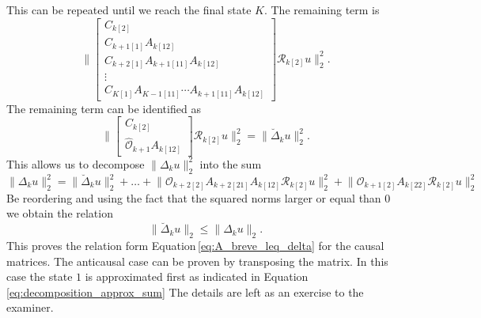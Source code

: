 \documentclass[doctype=mastersthesis,BCOR=15mm,biblatex]{ldvbook}%
\newcommand{\R}{\mathcal{R}} %
\newcommand{\Ob}{\mathcal{O}} %
\begin{document}
This can be repeated until we reach the final state $K$.
The remaining term is 
\begin{equation}
	\Bigg\|
	\begin{bmatrix}
	C_{k[2]}\\
	C_{k+1[1]}A_{k[12]}\\
	C_{k+2[1]}A_{k+1[11]}A_{k[12]}\\
	\vdots\\
	C_{K[1]}A_{K-1[11]}\cdots  A_{k+1[11]} A_{k[12]}
	\end{bmatrix}  \R_{k[2]} u
	\Bigg\|_2^2
	.
\end{equation}
The remaining term can be identified as 
\begin{equation}
\Bigg\|
\begin{bmatrix}
C_{k[2]}\\
\hat{\Ob}_{k+1}A_{k[12]}
\end{bmatrix}  \R_{k[2]} u
\Bigg\|_2^2
=
\Big\|\breve{\Delta}_k u\Big\|_2^2
.
\end{equation}
This allows us to decompose $\|\Delta_k u\|_2^2$ into the sum
\begin{equation*}
\|\Delta_k u\|_2^2
	  =
	    \|\breve{\Delta}_k u\|_2^2
	  + \dots +
	  \Big\|
	  \Ob_{k+2[2]}A_{k+2[21]}A_{k[12]}
	  \R_{k[2]} u
	  \Big\|_2^2
	  + \Big\|
	  \Ob_{k+1[2]}A_{k[22]}
	  \R_{k[2]} u
	  \Big\|_2^2
\end{equation*}
Be reordering and using the fact that the squared norms larger or equal than $0$ we obtain the relation
\begin{equation}
	\|\breve{\Delta}_k u\|_2 \leq \|\Delta_k u\|_2 
	.
\end{equation}
This proves the relation form Equation\,\ref{eq:A_breve_leq_delta} for the causal matrices.
The anticausal case can be proven by transposing the matrix.
In this case the state $1$ is approximated first as indicated in Equation\,\ref{eq:decomposition_approx_sum}
The details are left as an exercise to the examiner.
\end{document}

